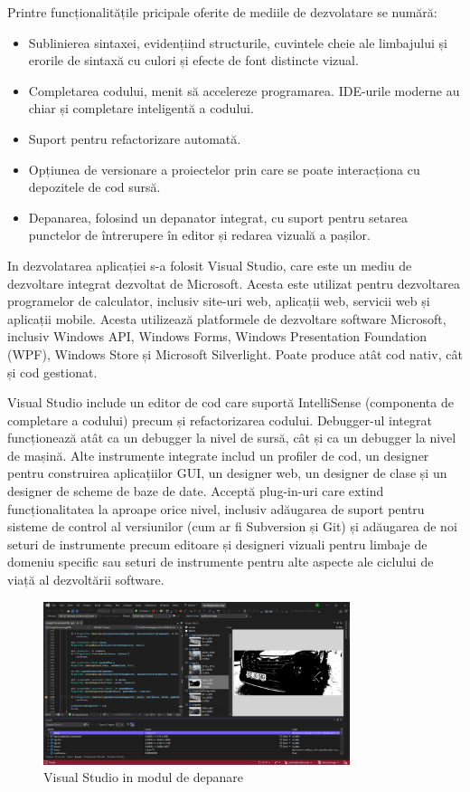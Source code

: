 \documentclass[a4paper,12pt]{report}
\begin{document}
Printre funcționalitățile pricipale oferite de mediile de dezvolatare se numără:
\begin{itemize}
    \item Sublinierea sintaxei, evidențiind structurile, cuvintele cheie ale limbajului și erorile de sintaxă cu culori și efecte de font distincte vizual.
    \item Completarea codului, menit să accelereze programarea. IDE-urile moderne au chiar și completare inteligentă a codului.
    \item Suport pentru refactorizare automată.
    \item Opțiunea de versionare a proiectelor prin care se poate interacționa cu depozitele de cod sursă.
    \item Depanarea, folosind un depanator integrat, cu suport pentru setarea punctelor de întrerupere în editor și redarea vizuală a pașilor.
\end{itemize}

In dezvolatarea aplicației s-a folosit Visual Studio, care este un mediu de dezvoltare integrat dezvoltat de Microsoft. Acesta este utilizat pentru dezvoltarea programelor de calculator, inclusiv site-uri web, aplicații web, servicii web și aplicații mobile. Acesta utilizează platformele de dezvoltare software Microsoft, inclusiv Windows API, Windows Forms, Windows Presentation Foundation (WPF), Windows Store și Microsoft Silverlight. Poate produce atât cod nativ, cât și cod gestionat.

Visual Studio include un editor de cod care suportă IntelliSense (componenta de completare a codului) precum și refactorizarea codului. Debugger-ul integrat funcționează atât ca un debugger la nivel de sursă, cât și ca un debugger la nivel de mașină. Alte instrumente integrate includ un profiler de cod, un designer pentru construirea aplicațiilor GUI, un designer web, un designer de clase și un designer de scheme de baze de date. Acceptă plug-in-uri care extind funcționalitatea la aproape orice nivel, inclusiv adăugarea de suport pentru sisteme de control al versiunilor (cum ar fi Subversion și Git) și adăugarea de noi seturi de instrumente precum editoare și designeri vizuali pentru limbaje de domeniu specific sau seturi de instrumente pentru alte aspecte ale ciclului de viață al dezvoltării software.

\begin{figure}[h!]
    \centering
    \includegraphics[width=0.8\textwidth]{images/visual_studio.jpg}
    \caption{Visual Studio in modul de depanare}
\end{figure}
\FloatBarrier
\end{document}
